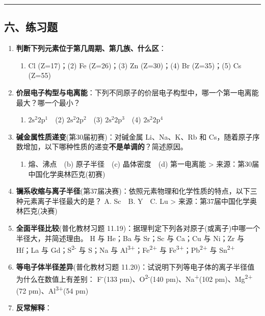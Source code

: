 \begin{center}\rule{0.5\linewidth}{0.5pt}\end{center}

\subsection{六、练习题}\label{ux516dux7ec3ux4e60ux9898}

\begin{enumerate}
\def\labelenumi{\arabic{enumi}.}
\item
  \textbf{判断下列元素位于第几周期、第几族、什么区}：

  \begin{enumerate}
  \def\labelenumii{(\arabic{enumii})}
  \tightlist
  \item
    Cl (Z=17)；(2) Fe (Z=26)；(3) Zn (Z=30)；(4) Br (Z=35)；(5) Cs (Z=55)
  \end{enumerate}
\item
  \textbf{价层电子构型与电离能}：下列不同原子的价层电子构型中，哪一个第一电离能最大？哪一个最小？

  \begin{enumerate}
  \def\labelenumii{(\arabic{enumii})}
  \tightlist
  \item
    \(2\mathrm{s}^2 2\mathrm{p}^1\)　(2) \(2\mathrm{s}^2 2\mathrm{p}^2\)　(3) \(2\mathrm{s}^2 2\mathrm{p}^3\)　(4) \(2\mathrm{s}^2 2\mathrm{p}^4\)
  \end{enumerate}
\item
  \textbf{碱金属性质递变}(第30届初赛)：对碱金属 Li、Na、K、Rb 和 Cs，随着原子序数增加，以下哪种性质的递变\textbf{不是单调的}？简述原因。

  \begin{enumerate}
  \def\labelenumii{(\alph{enumii})}
  \tightlist
  \item
    熔、沸点　(b) 原子半径　(c) 晶体密度　(d) 第一电离能
    \textgreater{} 来源：第30届中国化学奥林匹克(初赛)
  \end{enumerate}
\item
  \textbf{镧系收缩与离子半径}(第37届决赛)：依照元素物理和化学性质的特点，以下三种元素离子半径最大的是？
  A. Sc　B. Y　C. Lu
  \textgreater{} 来源：第37届中国化学奥林匹克(决赛)
\item
  \textbf{全面半径比较}(普化教材习题 11.19)：据理判定下列各对原子(或离子)中哪一个半径大，并简述理由。
  H 与 He；Ba 与 Sr；Sc 与 Ca；Cu 与 Ni；Zr 与 Hf；La 与 Gd；S\textsuperscript{2-} 与 S；Na 与 Al\textsuperscript{3+}；Fe\textsuperscript{2+} 与 Fe\textsuperscript{3+}；Pb\textsuperscript{2+} 与 Sn\textsuperscript{2+}
\item
  \textbf{等电子体半径差异}(普化教材习题 11.20)：试说明下列等电子体的离子半径值为什么在数值上有差别：
  F\textsuperscript{-}(133 pm)、O\textsuperscript{2-}(140 pm)、Na\textsuperscript{+}(102 pm)、Mg\textsuperscript{2+}(72 pm)、Al\textsuperscript{3+}(54 pm)
\item
  \textbf{反常解释}：


\end{enumerate}
